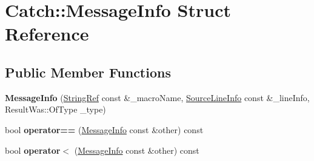 \hypertarget{struct_catch_1_1_message_info}{}\section{Catch\+:\+:Message\+Info Struct Reference}
\label{struct_catch_1_1_message_info}
\subsection*{Public Member Functions}
\begin{DoxyCompactItemize}
\item 
\mbox{\label{struct_catch_1_1_message_info_afac7a84a9e8655428035a3c5418044f0}} 
{\bfseries Message\+Info} (\mbox{\hyperlink{class_catch_1_1_string_ref}{String\+Ref}} const \&\+\_\+macro\+Name, \mbox{\hyperlink{struct_catch_1_1_source_line_info}{Source\+Line\+Info}} const \&\+\_\+line\+Info, Result\+Was\+::\+Of\+Type \+\_\+type)
\item 
\mbox{\label{struct_catch_1_1_message_info_af4b37f2172ba55395813b4bb6bbbde1a}} 
bool {\bfseries operator==} (\mbox{\hyperlink{struct_catch_1_1_message_info}{Message\+Info}} const \&other) const
\item 
\mbox{\label{struct_catch_1_1_message_info_a8254cb8fca2da02a29a9843cdcb79df1}} 
bool {\bfseries operator$<$} (\mbox{\hyperlink{struct_catch_1_1_message_info}{Message\+Info}} const \&other) const
\end{DoxyCompactItemize}
